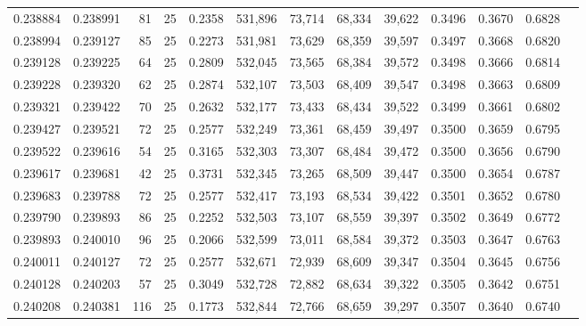 \begin{tabular}{rrrrrrrrrrrrr}
0.238884 & 0.238991 &    81 &  25 &                                     0.2358 & 531,896 &  73,714 &  68,334 &  39,622 & 0.3496 & 0.3670 & 0.6828 \\
0.238994 & 0.239127 &    85 &  25 &                                     0.2273 & 531,981 &  73,629 &  68,359 &  39,597 & 0.3497 & 0.3668 & 0.6820 \\
0.239128 & 0.239225 &    64 &  25 &                                     0.2809 & 532,045 &  73,565 &  68,384 &  39,572 & 0.3498 & 0.3666 & 0.6814 \\
0.239228 & 0.239320 &    62 &  25 &                                     0.2874 & 532,107 &  73,503 &  68,409 &  39,547 & 0.3498 & 0.3663 & 0.6809 \\
0.239321 & 0.239422 &    70 &  25 &                                     0.2632 & 532,177 &  73,433 &  68,434 &  39,522 & 0.3499 & 0.3661 & 0.6802 \\
0.239427 & 0.239521 &    72 &  25 &                                     0.2577 & 532,249 &  73,361 &  68,459 &  39,497 & 0.3500 & 0.3659 & 0.6795 \\
0.239522 & 0.239616 &    54 &  25 &                                     0.3165 & 532,303 &  73,307 &  68,484 &  39,472 & 0.3500 & 0.3656 & 0.6790 \\
0.239617 & 0.239681 &    42 &  25 &                                     0.3731 & 532,345 &  73,265 &  68,509 &  39,447 & 0.3500 & 0.3654 & 0.6787 \\
0.239683 & 0.239788 &    72 &  25 &                                     0.2577 & 532,417 &  73,193 &  68,534 &  39,422 & 0.3501 & 0.3652 & 0.6780 \\
0.239790 & 0.239893 &    86 &  25 &                                     0.2252 & 532,503 &  73,107 &  68,559 &  39,397 & 0.3502 & 0.3649 & 0.6772 \\
0.239893 & 0.240010 &    96 &  25 &                                     0.2066 & 532,599 &  73,011 &  68,584 &  39,372 & 0.3503 & 0.3647 & 0.6763 \\
0.240011 & 0.240127 &    72 &  25 &                                     0.2577 & 532,671 &  72,939 &  68,609 &  39,347 & 0.3504 & 0.3645 & 0.6756 \\
0.240128 & 0.240203 &    57 &  25 &                                     0.3049 & 532,728 &  72,882 &  68,634 &  39,322 & 0.3505 & 0.3642 & 0.6751 \\
0.240208 & 0.240381 &   116 &  25 &                                     0.1773 & 532,844 &  72,766 &  68,659 &  39,297 & 0.3507 & 0.3640 & 0.6740 \\

\end{tabular}
